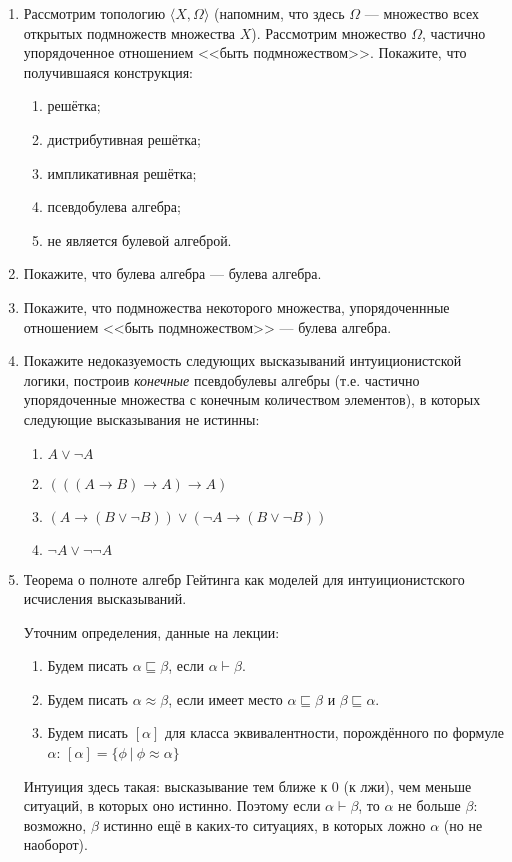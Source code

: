 \documentclass[10pt,a4paper,oneside]{article}
\begin{document}
\begin{enumerate}
\item Рассмотрим топологию $\langle X, \Omega\rangle$ (напомним, что здесь $\Omega$ --- множество
всех открытых подмножеств множества $X$). Рассмотрим множество $\Omega$, частично упорядоченное
отношением <<быть подмножеством>>. Покажите, что получившаяся конструкция:

\begin{enumerate}
\item решётка;
\item дистрибутивная решётка;
\item импликативная решётка;
\item псевдобулева алгебра;
\item не является булевой алгеброй.
\end{enumerate}

\item Покажите, что булева алгебра --- булева алгебра.
\item Покажите, что подмножества некоторого множества, упорядоченнные отношением 
<<быть подмножеством>> --- булева алгебра.

\item Покажите недоказуемость следующих высказываний интуиционистской логики, построив 
\emph{конечные} псевдобулевы алгебры (т.е. частично упорядоченные множества с конечным
количеством элементов), в которых следующие высказывания не истинны:

\begin{enumerate}
\item $A \vee \neg A$
\item $(((A \rightarrow B) \rightarrow A) \rightarrow A)$
\item $(A \rightarrow (B \vee \neg B)) \vee (\neg A \rightarrow (B \vee \neg B))$
\item $\neg A \vee \neg\neg A $
\end{enumerate}

\item Теорема о полноте алгебр Гейтинга как моделей для интуиционистского исчисления высказываний.

Уточним определения, данные на лекции:
\begin{enumerate}
\item Будем писать $\alpha\sqsubseteq\beta$, если $\alpha\vdash\beta$.
\item Будем писать $\alpha\approx\beta$, если имеет место $\alpha\sqsubseteq\beta$ и $\beta\sqsubseteq\alpha$.
\item Будем писать $[\alpha]$ для класса эквивалентности, порождённого по формуле $\alpha$:
$[\alpha] = \{\phi\ |\ \phi \approx \alpha \}$
\end{enumerate}
Интуиция здесь такая: высказывание тем ближе к 0 (к лжи), чем меньше ситуаций, в которых оно истинно. 
Поэтому если $\alpha\vdash\beta$, то $\alpha$ не больше $\beta$: возможно, $\beta$ истинно ещё в каких-то
ситуациях, в которых ложно $\alpha$ (но не наоборот).


\end{enumerate}
\end{document}
